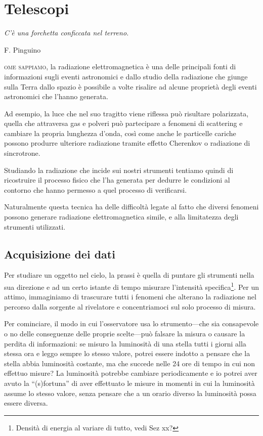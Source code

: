 \chapter{Telescopi}
    \epigraph{\itshape C'è una forchetta conficcata nel terreno.}{F. Pinguino}

    \noindent{}\textsc{ome sappiamo}, la radiazione elettromagnetica è una delle principali fonti di informazioni sugli eventi astronomici e dallo studio della radiazione che giunge sulla Terra dallo spazio è possibile a volte risalire ad alcune proprietà degli eventi astronomici che l'hanno generata.

    Ad esempio, la luce che nel suo tragitto viene riflessa può risultare polarizzata, quella che attraversa gas e polveri può partecipare a fenomeni di scattering e cambiare la propria lunghezza d'onda, così come anche le particelle cariche possono produrre ulteriore radiazione tramite effetto Cherenkov o radiazione di sincrotrone.

    Studiando la radiazione che incide sui nostri strumenti tentiamo quindi di ricostruire il processo fisico che l'ha generata per dedurre le condizioni al contorno che hanno permesso a quel processo di verificarsi.

    Naturalmente questa tecnica ha delle difficoltà legate al fatto che diversi fenomeni possono generare radiazione elettromagnetica simile, e alla limitatezza degli strumenti utilizzati.
    \section{Acquisizione dei dati}
        Per studiare un oggetto nel cielo, la prassi è quella di puntare gli strumenti nella sua direzione e ad un certo istante di tempo misurare l'intensità specifica\footnote{Densità di energia al variare di tutto, vedi Sez xx?}. Per un attimo, immaginiamo di trascurare tutti i fenomeni che alterano la radiazione nel percorso dalla sorgente al rivelatore e concentriamoci sul solo processo di misura.

        Per cominciare, il modo in cui l'osservatore usa lo strumento---che sia consapevole o no delle conseguenze delle proprie scelte---può falsare la misura o causare la perdita di informazioni: se misuro la luminosità di una stella tutti i giorni alla stessa ora e leggo sempre lo stesso valore, potrei essere indotto a pensare che la stella abbia luminosità costante, ma che succede nelle 24 ore di tempo in cui non effettuo misure? La luminosità potrebbe cambiare periodicamente e io potrei aver avuto la ``(s)fortuna'' di aver effettuato le misure in momenti in cui la luminosità assume lo stesso valore, senza pensare che a un orario diverso la luminosità possa essere diversa.

